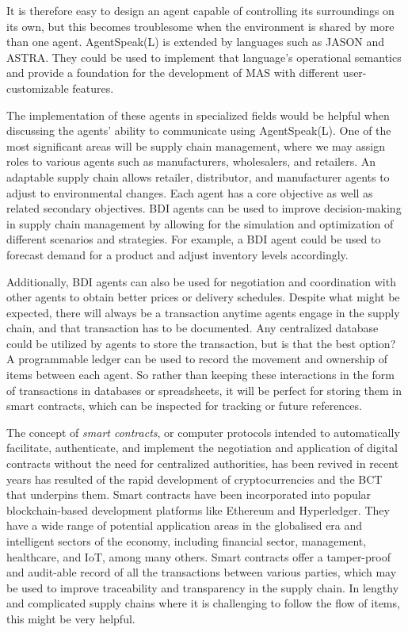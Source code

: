 It is therefore easy to design an agent capable of controlling its surroundings on its own, but this becomes troublesome when the environment is shared by more than one agent. AgentSpeak(L) is extended by languages such as JASON and \ac{ASTRA}. They could be used to implement that language's operational semantics and provide a foundation for the development of \ac{MAS} with different user-customizable features.

\vspace{.5cm}

The implementation of these agents in specialized fields would be helpful when discussing the agents' ability to communicate using AgentSpeak(L). One of the most significant areas will be supply chain management, where we may assign roles to various agents such as manufacturers, wholesalers, and retailers. An adaptable supply chain allows retailer, distributor, and manufacturer agents to adjust to environmental changes. Each agent has a core objective as well as related secondary objectives. \ac{BDI} agents can be used to improve decision-making in supply chain management by allowing for the simulation and optimization of different scenarios and strategies. For example, a \ac{BDI} agent could be used to forecast demand for a product and adjust inventory levels accordingly. 

\vspace{.5cm}

Additionally, \ac{BDI} agents can also be used for negotiation and coordination with other agents to obtain better prices or delivery schedules. Despite what might be expected, there will always be a transaction anytime agents engage in the supply chain, and that transaction has to be documented. Any centralized database could be utilized by agents to store the transaction, but is that the best option? A programmable ledger can be used to record the movement and ownership of items between each agent. So rather than keeping these interactions in the form of transactions in databases or spreadsheets, it will be perfect for storing them in smart contracts, which can be inspected for tracking or future references.	

\vspace{.5cm}

The concept of \textit{smart contracts}, or computer protocols intended to automatically facilitate, authenticate, and implement the negotiation and application of digital contracts without the need for centralized authorities, has been revived in recent years has resulted of the rapid development of cryptocurrencies and the \ac{BCT} that underpins them. Smart contracts have been incorporated into popular blockchain-based development platforms like Ethereum and Hyperledger. They have a wide range of potential application areas in the globalised era and intelligent sectors of the economy, including financial sector, management, healthcare, and \ac{IoT}, among many others. Smart contracts offer a tamper-proof and audit-able record of all the transactions between various parties, which may be used to improve traceability and transparency in the supply chain. In lengthy and complicated supply chains where it is challenging to follow the flow of items, this might be very helpful.

